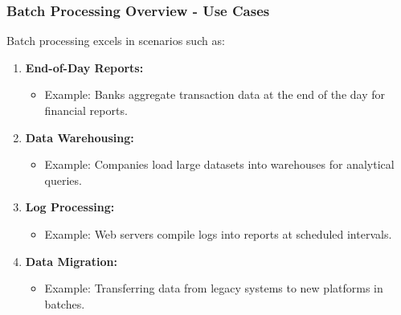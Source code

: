 \documentclass[aspectratio=169]{beamer}
\begin{document}
\begin{frame}[fragile]
    \frametitle{Batch Processing Overview - Use Cases}
    Batch processing excels in scenarios such as:

    \begin{enumerate}
        \item \textbf{End-of-Day Reports:}
            \begin{itemize}
                \item Example: Banks aggregate transaction data at the end of the day for financial reports.
            \end{itemize}
        \item \textbf{Data Warehousing:}
            \begin{itemize}
                \item Example: Companies load large datasets into warehouses for analytical queries.
            \end{itemize}
        \item \textbf{Log Processing:}
            \begin{itemize}
                \item Example: Web servers compile logs into reports at scheduled intervals.
            \end{itemize}
        \item \textbf{Data Migration:}
            \begin{itemize}
                \item Example: Transferring data from legacy systems to new platforms in batches.
            \end{itemize}
    \end{enumerate}
\end{frame}
\end{document}
